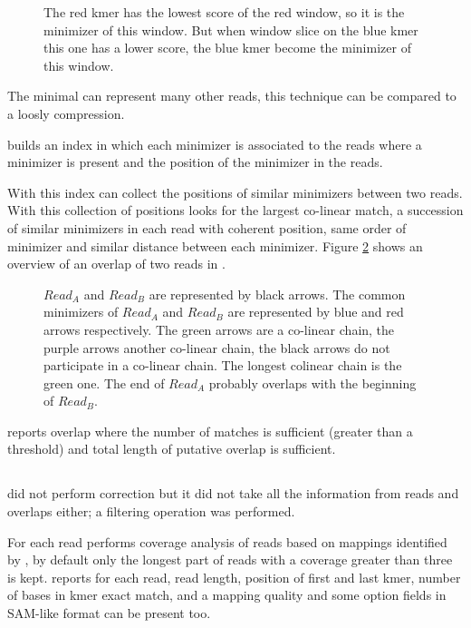 \documentclass[main]{subfiles}
\begin{document}
\begin{figure}[ht]
    \centering
    
    \caption{The red kmer has the lowest score of the red window, so it is the minimizer of this window. But when window slice on the blue kmer this one has a lower score, the blue kmer become the minimizer of this window.}
    \label{sota:fig:miniasm:minimizer}
\end{figure}

The minimal \kmer can represent many other reads, this technique can be compared to a loosly compression.

\minimap builds an index in which each minimizer is associated to the reads where a minimizer is present and the position of the minimizer in the reads.

With this index \minimap can collect the positions of similar minimizers between two reads. With this collection of positions \minimap looks for the largest co-linear match, a succession of similar minimizers in each read with coherent position, same order of minimizer and similar distance between each minimizer. Figure \ref{sota:fig:miniasm:mapping} shows an overview of an overlap of two reads in \minimap.

\begin{figure}[ht]
    \centering
    
    \caption{$Read_A$ and $Read_B$ are represented by black arrows. The common minimizers of $Read_A$ and $Read_B$ are represented by blue and red arrows respectively. The green arrows are a co-linear chain, the purple arrows another co-linear chain, the black arrows do not participate in a co-linear chain. The longest colinear chain is the green one. The end of $Read_A$ probably overlaps with the beginning of $Read_B$.}
    \label{sota:fig:miniasm:mapping}
\end{figure}

\minimap reports overlap where the number of matches is sufficient (greater than a threshold) and  total length of putative overlap is sufficient. 

\subsection{\miniasm}

\miniasm did not perform correction but it did not take all the information from reads and overlaps either; a filtering operation was performed.

For each read \miniasm performs coverage analysis of reads based on mappings identified by \minimap, by default only the longest part of reads with a coverage greater than three is kept. \minimap reports for each read, read length, position of first and last kmer, number of bases in kmer exact match, and a mapping quality and some option fields in SAM-like format can be present too.
\end{document}
